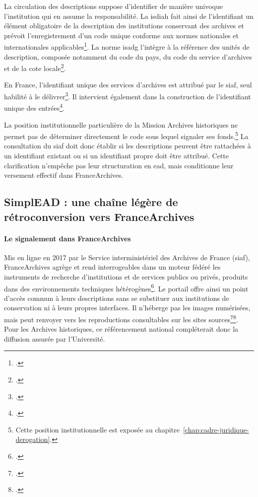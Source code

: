 La circulation des descriptions suppose d'identifier de manière univoque l'institution qui en assume la responsabilité. La \gls{isdiah} fait ainsi de l'identifiant un élément obligatoire de la description des institutions conservant des archives et prévoit l'enregistrement d'un code unique conforme aux normes nationales et internationales applicables\footcite[pp.~13 et 16]{ISDIAH2008}. La norme \gls{isadg} l'intègre à la référence des unités de description, composée notamment du code du pays, du code du service d'archives et de la cote locale\footcite{ISADG2000}.

En France, l'identifiant unique des services d'archives est attribué par le \gls{siaf}, seul habilité à le délivrer\footcite[p.~4]{SIAFEnquete2025}. Il intervient également dans la construction de l'identifiant unique des entrées\footcite{SchemaRegistreEntrees}.

La position institutionnelle particulière de la Mission Archives historiques ne permet pas de déterminer directement le code sous lequel signaler ses fonds.\footnote{Cette position institutionnelle est exposée au chapitre~\ref{chap:cadre-juridique-derogation}.} La consultation du \gls{siaf} doit donc établir si les descriptions peuvent être rattachées à un identifiant existant ou si un identifiant propre doit être attribué. Cette clarification n'empêche pas leur structuration en \gls{ead}, mais conditionne leur versement effectif dans FranceArchives.

\subsection{SimplEAD : une chaîne légère de rétroconversion vers FranceArchives}
\label{subsec:simplead-francearchives}

\paragraph{Le signalement dans FranceArchives}

Mis en ligne en 2017 par le Service interministériel des Archives de France (\gls{siaf}), FranceArchives agrège et rend interrogeables dans un moteur fédéré les instruments de recherche d'institutions et de services publics ou privés, produits dans des environnements techniques hétérogènes\footcite[pp.~34--35]{Restif2021}. Le portail offre ainsi un point d'accès commun à leurs descriptions sans se substituer aux institutions de conservation ni à leurs propres interfaces. Il n'héberge pas les images numérisées, mais peut renvoyer vers les reproductions consultables sur les sites sources\footcite{FranceArchivesContenu}\footcite{FranceArchivesRejoindre2026}. Pour les Archives historiques, ce référencement national compléterait donc la diffusion assurée par l'Université.

